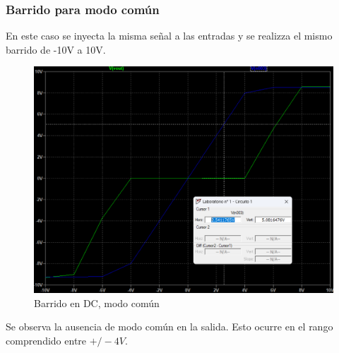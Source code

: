 \subsubsection{Barrido para modo común}

En este caso se inyecta la misma señal a las entradas y se realizza el mismo barrido de -10V a 10V.
\begin{figure}[H]
    \centering
    \includegraphics[width=1\linewidth]{Secciones/Circuito1/Barrido mc.png}
    
    \caption{Barrido en DC, modo común}
\end{figure}
Se observa la ausencia de modo común en la salida. Esto ocurre en el rango comprendido entre \(+/-4V\).

